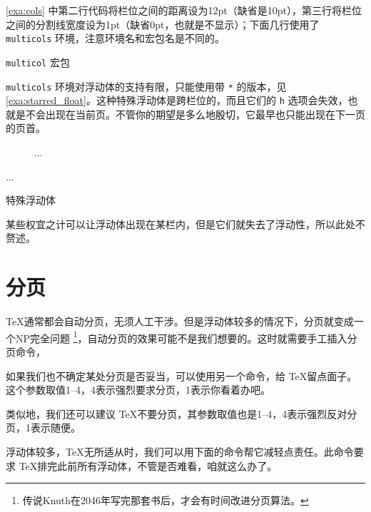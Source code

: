 \autoref{exa:cols} 中第二行代码将栏位之间的距离设为12pt（缺省是10pt），第三行将栏位之间的分割线宽度设为1pt（缺省0pt，也就是不显示）；下面几行使用了 \texttt{multicols} 环境，注意环境名和宏包名是不同的。

\begin{example}[h]
\caption{\texttt{multicol} 宏包}
\label{exa:cols}
\end{example}

\texttt{multicols} 环境对浮动体的支持有限，只能使用带 \texttt{*} 的版本，见 \autoref{exa:starred_float}。这种特殊浮动体是跨栏位的，而且它们的 \texttt{h} 选项会失效，也就是不会出现在当前页。不管你的期望是多么地殷切，它最早也只能出现在下一页的页首。

\begin{example}[h]
\begin{Code}[]
\begin{figure*}[tbp]
...
\end{figure*}

\begin{table*}[tbp]
...
\end{table*}
\end{Code}
\caption{特殊浮动体}
\label{exa:starred_float}
\end{example}

某些权宜之计可以让浮动体出现在某栏内，但是它们就失去了浮动性，所以此处不赘述。

\section{分页}

\TeX 通常都会自动分页，无须人工干涉。但是浮动体较多的情况下，分页就变成一个NP完全问题 \footnote{传说Knuth在2046年写完那套书后，才会有时间改进分页算法。}，自动分页的效果可能不是我们想要的。这时就需要手工插入分页命令，

\begin{Code}[numbers=none]
\newpage
\end{Code}

如果我们也不确定某处分页是否妥当，可以使用另一个命令，给 \TeX 留点面子。这个参数取值1--4，4表示强烈要求分页，1表示你看着办吧。

\begin{Code}[numbers=none]
\pagebreak[3]
\end{Code}

类似地，我们还可以建议 \TeX 不要分页，其参数取值也是1--4，4表示强烈反对分页，1表示随便。

\begin{Code}[numbers=none]
\nopagebreak[2]
\end{Code}

浮动体较多，\TeX 无所适从时，我们可以用下面的命令帮它减轻点责任。此命令要求 \TeX 排完此前所有浮动体，不管是否难看，咱就这么办了。

\begin{Code}[numbers=none]
\clearpage
\end{Code}



